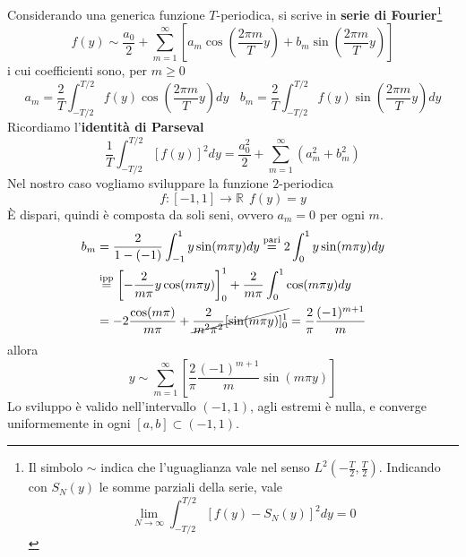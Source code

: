 \documentclass[10pt,a4paper,twoside,openright]{book}
\begin{document}
Considerando una generica funzione $T$-periodica, si scrive in \textbf{serie di Fourier}\footnote{Il simbolo $\sim $ indica che l'uguaglianza vale nel senso $L^{2}\left( -\frac{T}{2},\frac{T}{2}\right)$. Indicando con $S_{N}(y)$ le somme parziali della serie, vale
\begin{equation*}
\lim _{N\rightarrow \infty }\int ^{T/2}_{-T/2}[ f(y) -S_{N}(y)]^{2} dy=0
\end{equation*}}
\begin{equation*}
f(y) \sim \frac{a_{0}}{2} +\sum\limits ^{\infty }_{m=1}\left[ a_{m}\cos\left(\frac{2\pi m}{T} y\right) +b_{m}\sin\left(\frac{2\pi m}{T} y\right)\right]
\end{equation*}
i cui coefficienti sono, per $m\geqslant 0$
\begin{equation*}
a_{m} =\frac{2}{T}\int ^{T/2}_{-T/2} f(y)\cos\left(\frac{2\pi m}{T} y\right) dy\ \ \ \ b_{m} =\frac{2}{T}\int ^{T/2}_{-T/2} f(y)\sin\left(\frac{2\pi m}{T} y\right) dy
\end{equation*}
Ricordiamo l'\textbf{identità di Parseval}
\begin{equation*}
\frac{1}{T}\int ^{T/2}_{-T/2}[ f(y)]^{2} dy=\frac{a^{2}_{0}}{2} +\sum\limits ^{\infty }_{m=1}\left( a^{2}_{m} +b^{2}_{m}\right)
\end{equation*}
Nel nostro caso vogliamo sviluppare la funzione $2$-periodica
\begin{equation*}
f:[ -1,1]\rightarrow \mathbb{R} \ \ f(y) =y
\end{equation*}
È dispari, quindi è composta da soli seni, ovvero $a_{m}=0$ per ogni $m$.
\begin{align*}
b_{m} & = \frac{2}{1-(-1)}\int ^{1}_{-1} y\sin(m\pi y) dy \overset{\text{pari}}{=}2\int ^{1}_{0} y\sin(m\pi y) dy\\
 & \overset{\text{ipp}}{=}\left[ -\frac{2}{m\pi } y\cos(m\pi y)\right]^{1}_{0} +\frac{2}{m\pi }\int ^{1}_{0}\cos(m\pi y) dy\\
 & =-2\frac{\cos(m\pi)}{m\pi } +\cancel{\frac{2}{m^{2} \pi ^{2}}[\sin(m\pi y)]^{1}_{0}} =\frac{2}{\pi }\frac{(-1)^{m+1}}{m}
\end{align*}
allora
\begin{equation}
y\sim \sum\limits ^{\infty }_{m=1}\left[\frac{2}{\pi }\frac{(-1)^{m+1}}{m}\sin(m\pi y)\right]
\label{eq:diff-y-fourier}
\end{equation}
Lo sviluppo è valido nell'intervallo $(-1,1)$, agli estremi è nulla, e converge uniformemente in ogni $[ a,b] \subset (-1,1)$.
\end{document}
